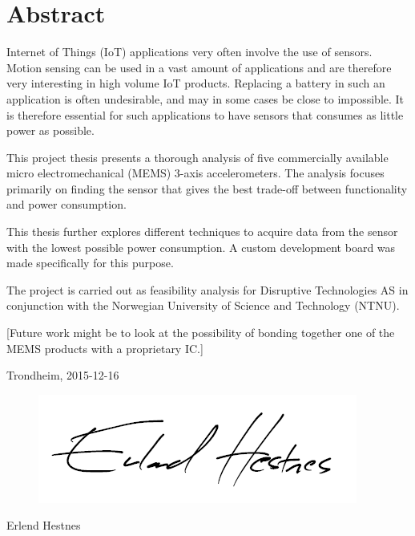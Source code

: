 \section*{Abstract}

Internet of Things (IoT) applications very often involve the use of sensors. Motion sensing can be used in a vast amount of applications and are therefore very interesting in high volume IoT products. Replacing a battery in such an application is often undesirable, and may in some cases be close to impossible. It is therefore essential for such applications to have sensors that consumes as little power as possible. 

This project thesis presents a thorough analysis of five commercially available micro electromechanical (MEMS) 3-axis accelerometers. The analysis focuses primarily on finding the sensor that gives the best trade-off between functionality and power consumption. 

This thesis further explores different techniques to acquire data from the sensor with the lowest possible power consumption. A custom development board was made specifically for this purpose.

The project is carried out as feasibility analysis for Disruptive Technologies AS in conjunction with the Norwegian University of Science and Technology (NTNU).

[Future work might be to look at the possibility of bonding together one of the MEMS products with a proprietary IC.]


\begin{center}
Trondheim, 2015-12-16\\[1pc]
\begin{figure}[h]
\centering
\includegraphics[scale=0.5]{fig/underskrift.png}
\label{fig:underskrift}
\end{figure}
Erlend Hestnes
\end{center}